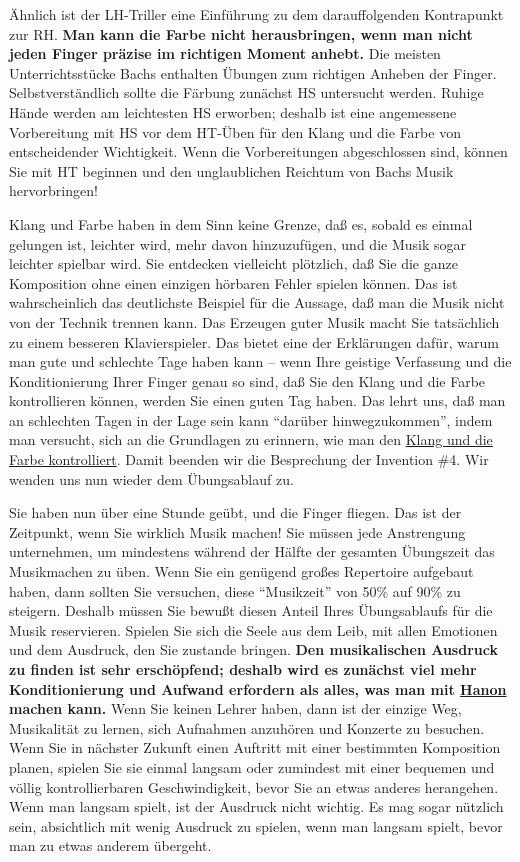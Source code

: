 Ähnlich ist der LH-Triller eine Einführung zu dem darauffolgenden Kontrapunkt zur RH.
\textbf{Man kann die Farbe nicht herausbringen, wenn man nicht jeden Finger präzise im richtigen Moment anhebt.}
Die meisten Unterrichtsstücke Bachs enthalten Übungen zum richtigen Anheben der Finger.
Selbstverständlich sollte die Färbung zunächst HS untersucht werden.
Ruhige Hände werden am leichtesten HS erworben; deshalb ist eine angemessene Vorbereitung mit HS vor dem HT-Üben für den Klang und die Farbe von entscheidender Wichtigkeit.
Wenn die Vorbereitungen abgeschlossen sind, können Sie mit HT beginnen und den unglaublichen Reichtum von Bachs Musik hervorbringen!

Klang und Farbe haben in dem Sinn keine Grenze, daß es, sobald es einmal gelungen ist, leichter wird, mehr davon hinzuzufügen, und die Musik sogar leichter spielbar wird.
Sie entdecken vielleicht plötzlich, daß Sie die ganze Komposition ohne einen einzigen hörbaren Fehler spielen können.
Das ist wahrscheinlich das deutlichste Beispiel für die Aussage, daß man die Musik nicht von der Technik trennen kann.
Das Erzeugen guter Musik macht Sie tatsächlich zu einem besseren Klavierspieler.
Das bietet eine der Erklärungen dafür, warum man gute und schlechte Tage haben kann -- wenn Ihre geistige Verfassung und die Konditionierung Ihrer Finger genau so sind, daß Sie den Klang und die Farbe kontrollieren können, werden Sie einen guten Tag haben.
Das lehrt uns, daß man an schlechten Tagen in der Lage sein kann \enquote{darüber hinwegzukommen}, indem man versucht, sich an die Grundlagen zu erinnern, wie man den \hyperref[c1iii1]{Klang und die Farbe kontrolliert}.
Damit beenden wir die Besprechung der Invention \#4.
Wir wenden uns nun wieder dem Übungsablauf zu.

Sie haben nun über eine Stunde geübt, und die Finger fliegen.
Das ist der Zeitpunkt, wenn Sie wirklich Musik machen!
Sie müssen jede Anstrengung unternehmen, um mindestens während der Hälfte der gesamten Übungszeit das Musikmachen zu üben.
Wenn Sie ein genügend großes Repertoire aufgebaut haben, dann sollten Sie versuchen, diese \enquote{Musikzeit} von 50\% auf 90\% zu steigern.
Deshalb müssen Sie bewußt diesen Anteil Ihres Übungsablaufs für die Musik reservieren.
Spielen Sie sich die Seele aus dem Leib, mit allen Emotionen und dem Ausdruck, den Sie zustande bringen.
\textbf{Den musikalischen Ausdruck zu finden ist sehr erschöpfend; deshalb wird es zunächst viel mehr Konditionierung und Aufwand erfordern als alles, was man mit \hyperref[c1iii7h]{Hanon} machen kann.}
Wenn Sie keinen Lehrer haben, dann ist der einzige Weg, Musikalität zu lernen, sich Aufnahmen anzuhören und Konzerte zu besuchen.
Wenn Sie in nächster Zukunft einen Auftritt mit einer bestimmten Komposition planen, spielen Sie sie einmal langsam oder zumindest mit einer bequemen und völlig kontrollierbaren Geschwindigkeit, bevor Sie an etwas anderes herangehen.
Wenn man langsam spielt, ist der Ausdruck nicht wichtig.
Es mag sogar nützlich sein, absichtlich mit wenig Ausdruck zu spielen, wenn man langsam spielt, bevor man zu etwas anderem übergeht.

